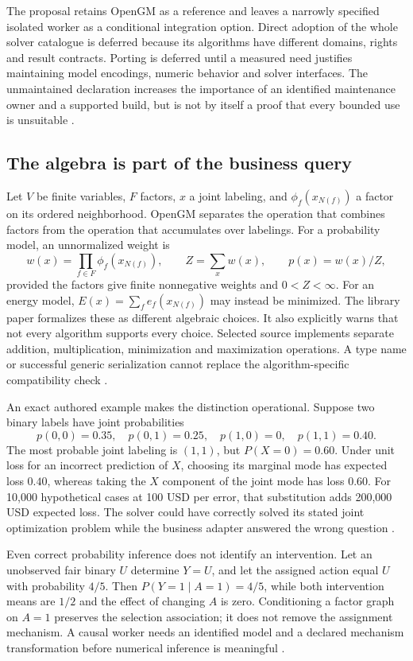 The proposal retains OpenGM as a reference and leaves a narrowly specified
isolated worker as a conditional integration option. Direct adoption of the
whole solver catalogue is deferred because its algorithms have different
domains, rights and result contracts. Porting is deferred until a measured
need justifies maintaining model encodings, numeric behavior and solver
interfaces. The unmaintained declaration increases the importance of an
identified maintenance owner and a supported build, but is not by itself a
proof that every bounded use is unsuitable \cite{exec24_opengm_choice}.

\subsection{The algebra is part of the business query}
Let $V$ be finite variables, $F$ factors, $x$ a joint labeling, and
$\phi_f(x_{N(f)})$ a factor on its ordered neighborhood. OpenGM separates
the operation that combines factors from the operation that accumulates
over labelings. For a probability model, an unnormalized weight is
\[
 w(x)=\prod_{f\in F}\phi_f(x_{N(f)}),\qquad
 Z=\sum_x w(x),\qquad p(x)=w(x)/Z,
\]
provided the factors give finite nonnegative weights and $0<Z<\infty$.
For an energy model, $E(x)=\sum_f e_f(x_{N(f)})$ may instead be minimized.
The library paper formalizes these as different algebraic choices. It also
explicitly warns that not every algorithm supports every choice. Selected
source implements separate addition, multiplication, minimization and
maximization operations. A type name or successful generic serialization
cannot replace the algorithm-specific compatibility check
\cite{exec24_opengm_paper,exec24_opengm_source}.

An exact authored example makes the distinction operational. Suppose two
binary labels have joint probabilities
\[
 p(0,0)=0.35,\quad p(0,1)=0.25,\quad p(1,0)=0,\quad p(1,1)=0.40.
\]
The most probable joint labeling is $(1,1)$, but $P(X=0)=0.60$. Under
unit loss for an incorrect prediction of $X$, choosing its marginal mode
has expected loss $0.40$, whereas taking the $X$ component of the joint
mode has loss $0.60$. For 10,000 hypothetical cases at 100 USD per error,
that substitution adds 200,000 USD expected loss. The solver could have
correctly solved its stated joint optimization problem while the business
adapter answered the wrong question \cite{exec24_opengm_choice}.

Even correct probability inference does not identify an intervention.
Let an unobserved fair binary $U$ determine $Y=U$, and let the assigned
action equal $U$ with probability $4/5$. Then $P(Y=1\mid A=1)=4/5$, while
both intervention means are $1/2$ and the effect of changing $A$ is zero.
Conditioning a factor graph on $A=1$ preserves the selection association;
it does not remove the assignment mechanism. A causal worker needs an
identified model and a declared mechanism transformation before numerical
inference is meaningful \cite{exec24_opengm_choice}.

